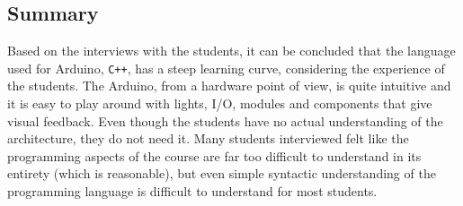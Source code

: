 \subsection{Summary}
Based on the interviews with the students, it can be concluded that the language used for Arduino, \texttt{C++}, has a steep learning curve, considering the experience of the students. 
The Arduino, from a hardware point of view, is quite intuitive and it is easy to play around with lights, I/O, modules and components that give visual feedback. 
Even though the students have no actual understanding of the architecture, they do not need it. 
Many students interviewed felt like the programming aspects of the course are far too difficult to understand in its entirety (which is reasonable), but even simple syntactic understanding of the programming language is difficult to understand for most students. 



